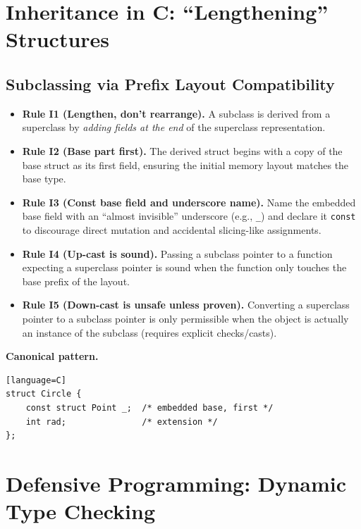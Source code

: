\documentclass[11pt]{article}
\begin{document}
\section{Inheritance in C: ``Lengthening'' Structures}

\subsection{Subclassing via Prefix Layout Compatibility}

\begin{itemize}
  \item \textbf{Rule I1 (Lengthen, don't rearrange).} A subclass is derived from a superclass by \emph{adding fields at the end} of the superclass representation.
  \item \textbf{Rule I2 (Base part first).} The derived struct begins with a copy of the base struct as its first field, ensuring the initial memory layout matches the base type.
  \item \textbf{Rule I3 (Const base field and underscore name).} Name the embedded base field with an ``almost invisible'' underscore (e.g., \texttt{\_}) and declare it \texttt{const} to discourage direct mutation and accidental slicing-like assignments.
  \item \textbf{Rule I4 (Up-cast is sound).} Passing a subclass pointer to a function expecting a superclass pointer is sound when the function only touches the base prefix of the layout.
  \item \textbf{Rule I5 (Down-cast is unsafe unless proven).} Converting a superclass pointer to a subclass pointer is only permissible when the object is actually an instance of the subclass (requires explicit checks/casts).
\end{itemize}

\noindent\textbf{Canonical pattern.}
\begin{verbatim}[language=C]
struct Circle {
    const struct Point _;  /* embedded base, first */
    int rad;               /* extension */
};
\end{verbatim}

\section{Defensive Programming: Dynamic Type Checking}
\end{document}
